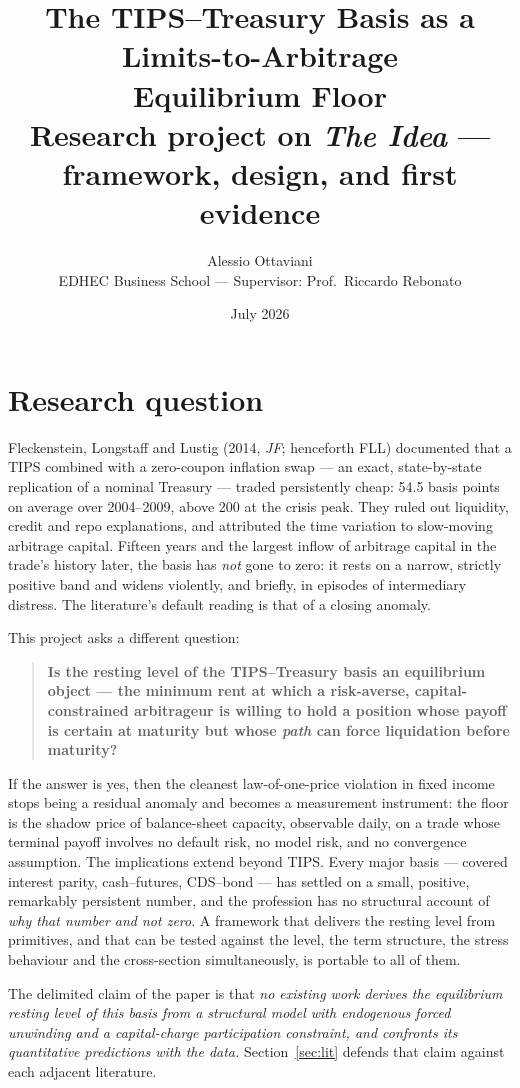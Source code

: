 \documentclass[11pt]{article}
\title{\textbf{The TIPS--Treasury Basis as a Limits-to-Arbitrage\\ Equilibrium Floor}\\[5pt]
\large Research project on \emph{The Idea} --- framework, design, and first evidence}
\author{Alessio Ottaviani\\ \small EDHEC Business School --- Supervisor: Prof.\ Riccardo Rebonato}
\date{July 2026}
\begin{document}
\maketitle

\section{Research question}

Fleckenstein, Longstaff and Lustig (2014, \emph{JF}; henceforth FLL) documented that a TIPS combined with a zero-coupon inflation swap --- an exact, state-by-state replication of a nominal Treasury --- traded persistently cheap: 54.5 basis points on average over 2004--2009, above 200 at the crisis peak. They ruled out liquidity, credit and repo explanations, and attributed the time variation to slow-moving arbitrage capital. Fifteen years and the largest inflow of arbitrage capital in the trade's history later, the basis has \emph{not} gone to zero: it rests on a narrow, strictly positive band and widens violently, and briefly, in episodes of intermediary distress. The literature's default reading is that of a closing anomaly.

This project asks a different question:

\begin{quote}
\textbf{Is the resting level of the TIPS--Treasury basis an equilibrium object --- the minimum rent at which a risk-averse, capital-constrained arbitrageur is willing to hold a position whose payoff is certain at maturity but whose \emph{path} can force liquidation before maturity?}
\end{quote}

If the answer is yes, then the cleanest law-of-one-price violation in fixed income stops being a residual anomaly and becomes a measurement instrument: the floor is the shadow price of balance-sheet capacity, observable daily, on a trade whose terminal payoff involves no default risk, no model risk, and no convergence assumption. The implications extend beyond TIPS. Every major basis --- covered interest parity, cash--futures, CDS--bond --- has settled on a small, positive, remarkably persistent number, and the profession has no structural account of \emph{why that number and not zero}. A framework that delivers the resting level from primitives, and that can be tested against the level, the term structure, the stress behaviour and the cross-section simultaneously, is portable to all of them.

The delimited claim of the paper is that \emph{no existing work derives the equilibrium resting level of this basis from a structural model with endogenous forced unwinding and a capital-charge participation constraint, and confronts its quantitative predictions with the data.} Section~\ref{sec:lit} defends that claim against each adjacent literature.
\end{document}
